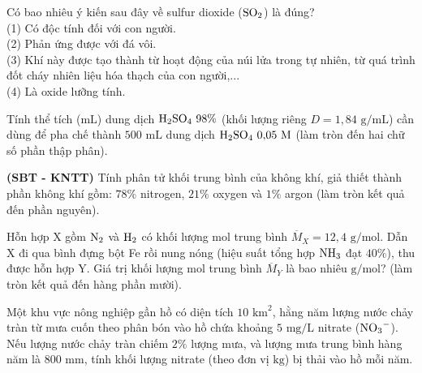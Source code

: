 \documentclass[12pt,a4paper]{article}
\begin{document}
\begin{ex}
Có bao nhiêu ý kiến sau đây về sulfur dioxide ($\ce{SO2}$) là đúng?\\
(1) Có độc tính đối với con người.\\
(2) Phản ứng được với đá vôi.\\
(3) Khí này được tạo thành từ hoạt động của núi lửa trong tự nhiên, từ quá trình đốt cháy nhiên liệu hóa thạch của con người,...\\
(4) Là oxide lưỡng tính.

\vspace{1.2cm}

\end{ex}

\begin{ex}
Tính thể tích ($\text{mL}$) dung dịch $\ce{H2SO4}\ 98\%$ (khối lượng riêng $D = 1{,}84\text{ g/mL}$) cần dùng để pha chế thành $500\text{ mL}$ dung dịch $\ce{H2SO4}\ 0{,}05\text{ M}$ (làm tròn đến hai chữ số phần thập phân).

\vspace{1.2cm}

\end{ex}

\begin{ex}
\textbf{(SBT - KNTT)} Tính phân tử khối trung bình của không khí, giả thiết thành phần không khí gồm: $78\%$ nitrogen, $21\%$ oxygen và $1\%$ argon (làm tròn kết quả đến phần nguyên).

\vspace{1.2cm}

\end{ex}

\begin{ex}
Hỗn hợp X gồm $\ce{N2}$ và $\ce{H2}$ có khối lượng mol trung bình $\overline{M}_X = 12{,}4\text{ g/mol}$. Dẫn X đi qua bình đựng bột Fe rồi nung nóng (hiệu suất tổng hợp $\ce{NH3}$ đạt $40\%$), thu được hỗn hợp Y. Giá trị khối lượng mol trung bình $\overline{M}_Y$ là bao nhiêu $\text{g/mol}$? (làm tròn kết quả đến hàng phần mười).

\vspace{1.2cm}

\end{ex}

\begin{ex}
Một khu vực nông nghiệp gần hồ có diện tích $10\text{ km}^2$, hằng năm lượng nước chảy tràn từ mưa cuốn theo phân bón vào hồ chứa khoảng $5\text{ mg/L}$ nitrate ($\ce{NO3-}$). Nếu lượng nước chảy tràn chiếm $2\%$ lượng mưa, và lượng mưa trung bình hàng năm là $800\text{ mm}$, tính khối lượng nitrate (theo đơn vị $\text{kg}$) bị thải vào hồ mỗi năm.

\vspace{1.2cm}

\end{ex}
\end{document}
